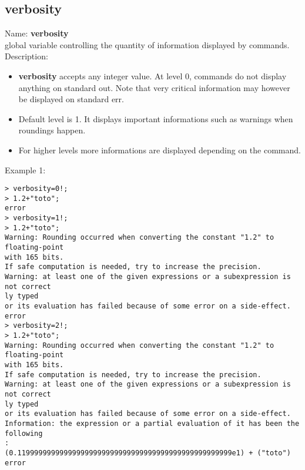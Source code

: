 \subsection{ verbosity }
\noindent Name: \textbf{verbosity}\\
global variable controlling the quantity of information displayed by commands.\\

\noindent Description: \begin{itemize}

\item \textbf{verbosity} accepts any integer value. At level 0, commands do not display anything
   on standard out. Note that very critical information may however be displayed on
   standard err.

\item Default level is 1. It displays important informations such as warnings when 
   roundings happen.

\item For higher levels more informations are displayed depending on the command.
\end{itemize}
\noindent Example 1: 
\begin{center}\begin{minipage}{15cm}\begin{Verbatim}[frame=single]
> verbosity=0!;
> 1.2+"toto";
error
> verbosity=1!;
> 1.2+"toto";
Warning: Rounding occurred when converting the constant "1.2" to floating-point 
with 165 bits.
If safe computation is needed, try to increase the precision.
Warning: at least one of the given expressions or a subexpression is not correct
ly typed
or its evaluation has failed because of some error on a side-effect.
error
> verbosity=2!;
> 1.2+"toto";
Warning: Rounding occurred when converting the constant "1.2" to floating-point 
with 165 bits.
If safe computation is needed, try to increase the precision.
Warning: at least one of the given expressions or a subexpression is not correct
ly typed
or its evaluation has failed because of some error on a side-effect.
Information: the expression or a partial evaluation of it has been the following
:
(0.119999999999999999999999999999999999999999999999999e1) + ("toto")
error
\end{Verbatim}
\end{minipage}\end{center}

